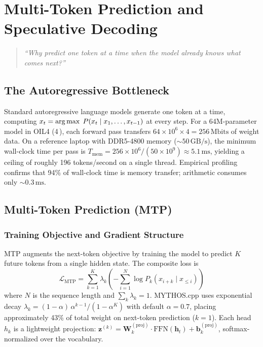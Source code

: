\chapter{Multi-Token Prediction and Speculative Decoding}
\label{ch:mtp}

\begin{quote}
\textit{``Why predict one token at a time when the model already knows what comes next?''}
\end{quote}

\section{The Autoregressive Bottleneck}
\label{sec:autoregressive_bottleneck}

Standard autoregressive language models generate one token at a time,
computing $x_t = \argmax\; P(x_t \mid x_1, \ldots, x_{t-1})$ at every
step. For a 64M-parameter model in OIL4 (4\,\BPW), each forward pass
transfers $64\times 10^6 \times 4 = 256\,\text{Mbits}$ of weight data.
On a reference laptop with DDR5-4800 memory ($\sim 50\,\text{GB/s}$),
the minimum wall-clock time per pass is
$T_{\text{mem}} = 256\times 10^6 / (50\times 10^9) \approx
5.1\,\text{ms}$, yielding a ceiling of roughly 196 tokens/second on a
single thread. Empirical profiling confirms that 94\% of wall-clock
time is memory transfer; arithmetic consumes only $\sim 0.3\,\text{ms}$.

\section{Multi-Token Prediction (MTP)}
\label{sec:mtp}

\subsection{Training Objective and Gradient Structure}

MTP augments the next-token objective by training the model to predict
$K$ future tokens from a single hidden state. The composite loss is
\[
\mathcal{L}_{\text{MTP}} = \sum_{k=1}^{K} \lambda_k \left(
  -\sum_{i=1}^{N} \log P_k(x_{i+k} \mid x_{\le i}) \right)
\]
where $N$ is the sequence length and $\sum_k \lambda_k = 1$. MYTHOS.cpp
uses exponential decay $\lambda_k = (1-\alpha)\,\alpha^{k-1} /
(1-\alpha^K)$ with default $\alpha = 0.7$, placing approximately 43\%
of total weight on next-token prediction ($k=1$). Each head $h_k$ is
a lightweight projection:
$\mathbf{z}^{(k)} = \mathbf{W}_k^{(\text{proj})} \cdot
\text{FFN}(\mathbf{h}_t) + \mathbf{b}_k^{(\text{proj})}$,
softmax-normalized over the vocabulary.

